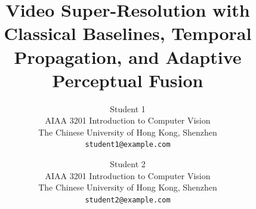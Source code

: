 \documentclass[10pt,twocolumn,letterpaper]{article}
\title{Video Super-Resolution with Classical Baselines, Temporal Propagation, and Adaptive Perceptual Fusion}
\author{Student 1\\
AIAA 3201 Introduction to Computer Vision\\
The Chinese University of Hong Kong, Shenzhen\\
{\tt\small student1@example.com}
\and
Student 2\\
AIAA 3201 Introduction to Computer Vision\\
The Chinese University of Hong Kong, Shenzhen\\
{\tt\small student2@example.com}
}
\begin{document}
\maketitle






{
    \small
    
    
}
\end{document}
